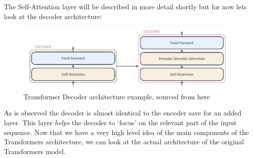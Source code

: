 The Self-Attention layer will be described in more detail shortly but for now lets look at the decoder architecture:
\begin{figure}[H]
	\centering
	\includegraphics[width=1\linewidth]{figures/decoder_archi_1.png}
	\caption{Transformer Decoder architecture example, sourced from here~\autocite{alammarIllustratedTransformer}}
	\label{fig:transformer_decoder}
\end{figure}
As is observed the decoder is almost identical to the encoder save for an added  layer. This layer
\emph{helps} the decoder to `focus' on the relevant part of the input sequence.
Now that we have a very high level idea of the main components of the Transformers architecture, we can look at the actual architecture of
the original Transformers model.

